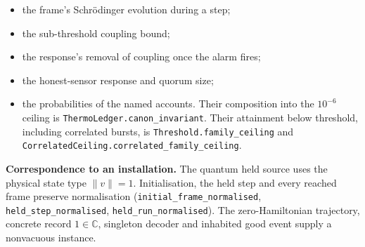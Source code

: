 \documentclass[
]{article}
\providecommand{\tightlist}{%
  \setlength{\itemsep}{0pt}\setlength{\parskip}{0pt}}
\begin{document}
\begin{itemize}
\tightlist
\item
  the frame's Schrödinger evolution during a step;
\item
  the sub-threshold coupling bound;
\item
  the response's removal of coupling once the alarm fires;
\item
  the honest-sensor response and quorum size;
\item
  the probabilities of the named accounts. Their composition into the
  \(10^{-6}\) ceiling is
  \texttt{T\allowbreak{}h\allowbreak{}e\allowbreak{}r\allowbreak{}m\allowbreak{}o\allowbreak{}L\allowbreak{}e\allowbreak{}d\allowbreak{}g\allowbreak{}e\allowbreak{}r\allowbreak{}.\allowbreak{}c\allowbreak{}a\allowbreak{}n\allowbreak{}o\allowbreak{}n\allowbreak{}\_\allowbreak{}i\allowbreak{}n\allowbreak{}v\allowbreak{}a\allowbreak{}r\allowbreak{}i\allowbreak{}a\allowbreak{}n\allowbreak{}t}.
  Their attainment below threshold, including correlated bursts, is
  \texttt{T\allowbreak{}h\allowbreak{}r\allowbreak{}e\allowbreak{}s\allowbreak{}h\allowbreak{}o\allowbreak{}l\allowbreak{}d\allowbreak{}.\allowbreak{}f\allowbreak{}a\allowbreak{}m\allowbreak{}i\allowbreak{}l\allowbreak{}y\allowbreak{}\_\allowbreak{}c\allowbreak{}e\allowbreak{}i\allowbreak{}l\allowbreak{}i\allowbreak{}n\allowbreak{}g}
  and
  \texttt{C\allowbreak{}o\allowbreak{}r\allowbreak{}r\allowbreak{}e\allowbreak{}l\allowbreak{}a\allowbreak{}t\allowbreak{}e\allowbreak{}d\allowbreak{}C\allowbreak{}e\allowbreak{}i\allowbreak{}l\allowbreak{}i\allowbreak{}n\allowbreak{}g\allowbreak{}.\allowbreak{}c\allowbreak{}o\allowbreak{}r\allowbreak{}r\allowbreak{}e\allowbreak{}l\allowbreak{}a\allowbreak{}t\allowbreak{}e\allowbreak{}d\allowbreak{}\_\allowbreak{}f\allowbreak{}a\allowbreak{}m\allowbreak{}i\allowbreak{}l\allowbreak{}y\allowbreak{}\_\allowbreak{}c\allowbreak{}e\allowbreak{}i\allowbreak{}l\allowbreak{}i\allowbreak{}n\allowbreak{}g}.
\end{itemize}

\textbf{Correspondence to an installation.} The quantum held source uses
the physical state type \(\|v\|=1\). Initialisation, the held step and
every reached frame preserve normalisation
(\texttt{i\allowbreak{}n\allowbreak{}i\allowbreak{}t\allowbreak{}i\allowbreak{}a\allowbreak{}l\allowbreak{}\_\allowbreak{}f\allowbreak{}r\allowbreak{}a\allowbreak{}m\allowbreak{}e\allowbreak{}\_\allowbreak{}n\allowbreak{}o\allowbreak{}r\allowbreak{}m\allowbreak{}a\allowbreak{}l\allowbreak{}i\allowbreak{}s\allowbreak{}e\allowbreak{}d},
\texttt{h\allowbreak{}e\allowbreak{}l\allowbreak{}d\allowbreak{}\_\allowbreak{}s\allowbreak{}t\allowbreak{}e\allowbreak{}p\allowbreak{}\_\allowbreak{}n\allowbreak{}o\allowbreak{}r\allowbreak{}m\allowbreak{}a\allowbreak{}l\allowbreak{}i\allowbreak{}s\allowbreak{}e\allowbreak{}d},
\texttt{h\allowbreak{}e\allowbreak{}l\allowbreak{}d\allowbreak{}\_\allowbreak{}r\allowbreak{}u\allowbreak{}n\allowbreak{}\_\allowbreak{}n\allowbreak{}o\allowbreak{}r\allowbreak{}m\allowbreak{}a\allowbreak{}l\allowbreak{}i\allowbreak{}s\allowbreak{}e\allowbreak{}d}).
The zero-Hamiltonian trajectory, concrete record \(1\in\mathbb C\),
singleton decoder and inhabited good event supply a nonvacuous instance.
\end{document}
